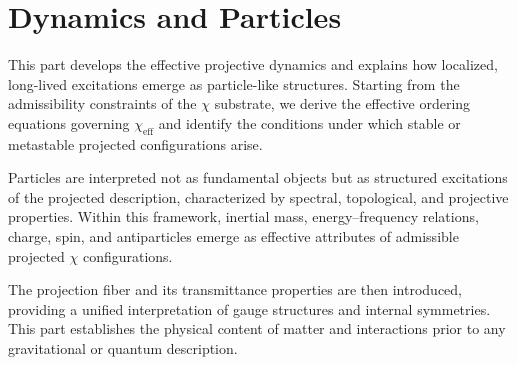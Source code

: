 \clearpage
\part{Dynamics and Particles}
  \label{part:dynamics-and-particles}

  This part develops the effective projective dynamics and explains how
  localized, long-lived excitations emerge as particle-like structures.
  Starting from the admissibility constraints of the $\chi$ substrate, we
  derive the effective ordering equations governing $\chi_{\mathrm{eff}}$
  and identify the conditions under which stable or metastable projected
  configurations arise.

  Particles are interpreted not as fundamental objects but as structured
  excitations of the projected description, characterized by spectral,
  topological, and projective properties.
  Within this framework, inertial mass, energy--frequency relations, charge,
  spin, and antiparticles emerge as effective attributes of admissible
  projected $\chi$ configurations.

  The projection fiber and its transmittance properties are then introduced,
  providing a unified interpretation of gauge structures and internal
  symmetries.
  This part establishes the physical content of matter and interactions
  prior to any gravitational or quantum description.

  \clearpage
  
  
  
  
